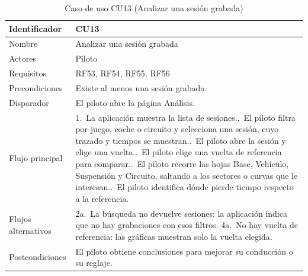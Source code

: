 \clearpage   %
\begin{table}[H]
	\centering
	\renewcommand{\arraystretch}{1.5}
	\begin{tabular}{|l|p{10cm}|}
		\hline
		Identificador & CU13 \\
		\hline
		Nombre & Analizar una sesión grabada \\
		\hline
		Actores & Piloto \\
		\hline
		Requisitos & RF53, RF54, RF55, RF56 \\
		\hline
		Precondiciones & Existe al menos una sesión grabada. \\
		\hline
		Disparador & El piloto abre la página Análisis. \\
		\hline
		Flujo principal & 1.~La aplicación muestra la lista de sesiones.\newline
		2.~El piloto filtra por juego, coche o circuito y selecciona una sesión, cuyo trazado y tiempos se muestran.\newline
		3.~El piloto abre la sesión y elige una vuelta.\newline
		4.~El piloto elige una vuelta de referencia para comparar.\newline
		5.~El piloto recorre las hojas Base, Vehículo, Suspensión y Circuito, saltando a los sectores o curvas que le interesan.\newline
		6.~El piloto identifica dónde pierde tiempo respecto a la referencia. \\
		\hline
		Flujos alternativos & 2a.~La búsqueda no devuelve sesiones: la aplicación indica que no hay grabaciones con esos filtros.\newline
		4a.~No hay vuelta de referencia: las gráficas muestran solo la vuelta elegida. \\
		\hline
		Postcondiciones & El piloto obtiene conclusiones para mejorar su conducción o su reglaje. \\
		\hline
	\end{tabular}
	\caption{Caso de uso CU13 (Analizar una sesión grabada)}
	\label{tab:cu13}
\end{table}


